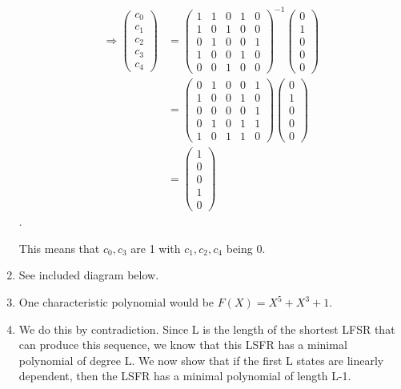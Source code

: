 \begin{enumerate}
\begin{align*}
\Rightarrow 
\begin{pmatrix}
c_0 \\ c_1 \\ c_2 \\ c_3 \\ c_4
\end{pmatrix}
&=
\begin{pmatrix}
1 & 1 & 0 & 1 & 0 \\
1 & 0 & 1 & 0 & 0 \\
0 & 1 & 0 & 0 & 1 \\
1 & 0 & 0 & 1 & 0 \\
0 & 0 & 1 & 0 & 0 
\end{pmatrix}^{-1}
\begin{pmatrix} 0 \\  1 \\ 0 \\ 0 \\ 0 \end{pmatrix} \\
&=
\begin{pmatrix}
0 & 1 & 0 & 0 & 1 \\
1 & 0 & 0 & 1 & 0 \\
0 & 0 & 0 & 0 & 1 \\
0 & 1 & 0 & 1 & 1 \\
1 & 0 & 1 & 1 & 0
\end{pmatrix}
\begin{pmatrix} 0 \\  1 \\ 0 \\ 0 \\ 0 \end{pmatrix} \\
&=
\begin{pmatrix} 1 \\  0 \\ 0 \\ 1 \\ 0 \end{pmatrix}
\end{align*}.

This means that $c_0, c_3$ are 1 with $c_1, c_2, c_4$ being 0.

\item See included diagram below.


\item One characteristic polynomial would be $F(X) = X^5 + X^3 + 1$.

\item We do this by contradiction. Since L is the length of the shortest LFSR
that can produce this sequence, we know that this LSFR has a minimal polynomial of
degree L. We now show that if the first L states are linearly dependent,
then the LSFR has a minimal polynomial of length L-1.


\end{enumerate}
